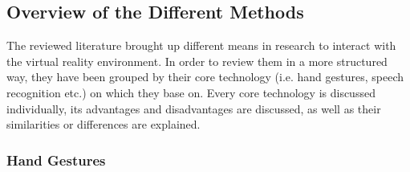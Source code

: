 \subsection{Overview of the Different Methods}

The reviewed literature brought up different means in research to interact with the virtual reality environment. In order to review them in a more structured way, they have been grouped by their core technology (i.e. hand gestures, speech recognition etc.) on which they base on. Every core technology is discussed individually, its advantages and disadvantages are discussed, as well as their similarities or differences are explained.


\subsubsection{Hand Gestures}

\label{SubSubSectionHandGestures}

